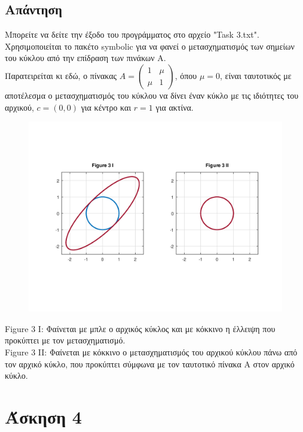 \documentclass[a4paper,12pt]{article}
\begin{document}
\subsection{Απάντηση}
Μπορείτε να δείτε την έξοδο του προγράμματος στο αρχείο "Task 3.txt".\\
Χρησιμοποιείται το πακέτο symbolic για να φανεί ο μετασχηματισμός των σημείων
του κύκλου από την επίδραση των πινάκων Α.\\
Παρατειρείται κι εδώ, ο πίνακας $
	A = \begin{pmatrix}
		1   & \mu \\
		\mu & 1
	\end{pmatrix}
$, όπου $\mu = 0$, είναι ταυτοτικός με αποτέλεσμα ο μετασχηματισμός του κύκλου
να δίνει έναν κύκλο με τις ιδιότητες του αρχικού, $c=(0, 0)$ για κέντρο και
$r=1$ για ακτίνα.
\begin{center}
	\begin{figure}[H]
		\centering
		\includegraphics[scale=0.8]{Task_3.png}
	\end{figure}
	Figure 3 I: Φαίνεται με μπλε ο αρχικός κύκλος και με κόκκινο η έλλειψη που
	προκύπτει με τον μετασχηματισμό.\\
	Figure 3 II: Φαίνεται με κόκκινο ο μετασχηματισμός του αρχικού κύκλου πάνω
	από τον αρχικό κύκλο, που προκύπτει σύμφωνα με τον ταυτοτικό πίνακα Α
	στον αρχικό κύκλο.
\end{center}
\newpage\section{Άσκηση 4}
\end{document}

